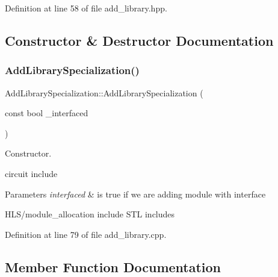 Definition at line 58 of file add\+\_\+library.\+hpp.



\subsection{Constructor \& Destructor Documentation}
\mbox{\label{classAddLibrarySpecialization_a37df5ad6204b4a17d5cca460bf6d5fd8}} 
\subsubsection{\texorpdfstring{Add\+Library\+Specialization()}{AddLibrarySpecialization()}}
{\footnotesize\ttfamily Add\+Library\+Specialization\+::\+Add\+Library\+Specialization (\begin{DoxyParamCaption}\item[{const bool}]{\+\_\+interfaced }\end{DoxyParamCaption})\hspace{0.3cm}{\ttfamily [explicit]}}



Constructor. 

circuit include


\begin{DoxyParams}{Parameters}
{\em interfaced} & is true if we are adding module with interface\\
\hline
\end{DoxyParams}
H\+L\+S/module\+\_\+allocation include S\+TL includes 

Definition at line 79 of file add\+\_\+library.\+cpp.



\subsection{Member Function Documentation}
\mbox{\label{classAddLibrarySpecialization_a456faa44646d3e8b63b8f77e11c88caa}} 

